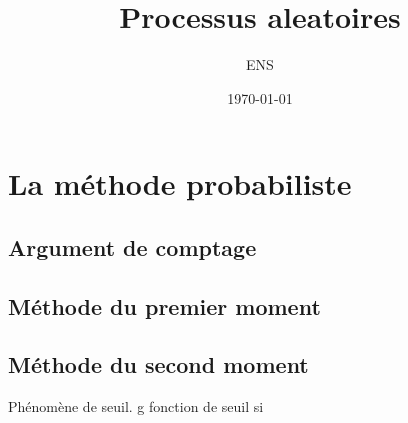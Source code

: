 \documentclass{article}		%
\begin{document}
\title{Processus aleatoires}
\author{ENS}
\date\today

\maketitle
\section{La méthode probabiliste}
\subsection{Argument de comptage}
\subsection{Méthode du premier moment}
\subsection{Méthode du second moment}
Phénomène de seuil. g fonction de seuil si
\end{document}
